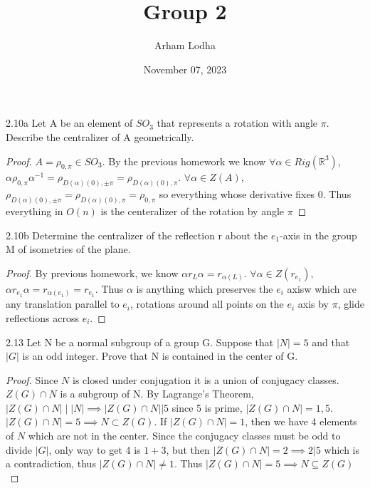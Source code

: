 \documentclass{article}
\newcommand{\R}{\mathbb{R}}
\newcommand{\abs}[1]{\lvert #1\rvert}
\begin{document}
\title{Group 2}
\author{Arham Lodha}%
\date{November 07, 2023}%
\maketitle

\begin{PROB}{2.10a}\label{Problem 2.10a.}
    Let A be an element of $SO_3$ that represents a rotation with angle $\pi$. Describe the centralizer of A geometrically.
\end{PROB}
\begin{proof}
    $A = \rho_{0, \pi} \in SO_3$. By the previous homework we know $\forall \alpha \in Rig(\R^3)$, $\alpha \rho_{0, \pi} \alpha^{-1} = \rho_{D(\alpha)(0), \pm\pi} = \rho_{D(\alpha)(0), \pi}$. $\forall \alpha \in Z(A)$, $\rho_{D(\alpha)(0), \pm\pi} = \rho_{D(\alpha)(0), \pi} = \rho_{0, \pi}$ so everything whose derivative fixes $0$. Thus everything in $O(n)$ is the centeralizer of the rotation by angle $\pi$
\end{proof}

\begin{PROB}{2.10b}\label{Problem 2.10b.}
    Determine the centralizer of the reflection r about the $e_1$-axis in the group M of isometries of the plane.
\end{PROB}
\begin{proof}
    By previous homework, we know $\alpha r_L \alpha = r_{\alpha(L)}$. $\forall \alpha \in Z(r_{e_1})$, $\alpha r_{e_1} \alpha = r_{\alpha(e_1)} = r_{e_1}$. Thus $\alpha$ is anything which preserves the $e_i$ axisw which are any translation parallel to $e_i$, rotations around all points on the $e_i$ axis by $\pi$, glide reflections across $e_i$. 
\end{proof}

\bigskip

\begin{PROB}{2.13}\label{Problem 2.13.}
    Let N be a normal subgroup of a group G. Suppose that $|N| = 5$ and that $|G|$ is an odd integer. Prove that N is contained in the center of G.
\end{PROB}
\begin{proof}
    Since $N$ is closed under conjugation it is a union of conjugacy classes. $Z(G) \cap N$ is a subgroup of N. By Lagrange's Theorem, $\abs{Z(G) \cap N} \mid \abs{N} \implies  \abs{Z(G) \cap N} | 5$ since 5 is prime, $\abs{Z(G) \cap N} = 1, 5$. $\abs{Z(G) \cap N} = 5 \implies N \subset Z(G)$. If $\abs{Z(G) \cap N} = 1$, then we have 4 elements of $N$ which are not in the center. Since the conjugacy classes must be odd to divide $|G|$, only way to get 4 is $1 + 3$, but then $\abs{Z(G) \cap N} = 2 \implies 2 | 5$ which is a contradiction, thus $\abs{Z(G) \cap N} \neq 1$. Thus $\abs{Z(G) \cap N} = 5 \implies N \subseteq Z(G)$ 
\end{proof}
\end{document}
